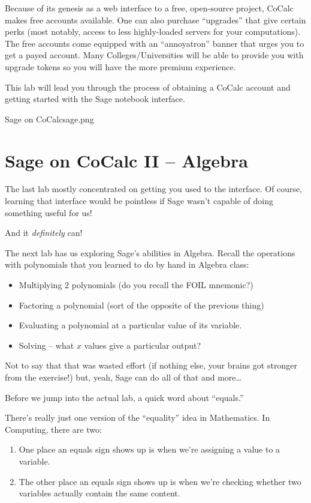Because of its genesis as a web interface to a free, open-source project, CoCalc makes free accounts available.  One can also purchase ``upgrades'' that give certain perks (most notably, access to less highly-loaded servers for your computations).  The free accounts come equipped with an ``annoyatron'' banner that urges you to get a payed account.  Many Colleges/Universities will be able to provide you with upgrade tokens so you will have the more premium experience.


This lab will lead you through the process of obtaining a CoCalc account and getting started with the Sage notebook interface.

\clearpage
\begin{worksheet}{7}{Sage on CoCalc}{sage.png}

\end{worksheet}
\clearpage

\section{Sage on CoCalc II -- Algebra}

The last lab mostly concentrated on getting you used to the interface. Of course, learning that interface would be pointless if Sage wasn't capable of doing something useful for us!

And it {\em definitely} can!

The next lab has us exploring Sage's abilities in Algebra.  Recall the operations with polynomials that you learned to do by hand in Algebra class:

\begin{itemize}
	\item Multiplying 2 polynomials (do you recall the FOIL mnemonic?)
	\item Factoring a polynomial (sort of the opposite of the previous thing)
	\item Evaluating a polynomial at a particular value of its variable.
	\item Solving -- what $x$ values give a particular output?
\end{itemize}

Not to say that that was wasted effort (if nothing else, your brains got stronger from the exercise!)
but, yeah, Sage can do all of that and more\dots

Before we jump into the actual lab, a quick word about ``equals.''

There's really just one version of the ``equality'' idea in Mathematics.  In Computing, there are two:
\begin{enumerate}
	\item One place an equals sign shows up is when we're assigning a value to a variable.
	\item The other place an equals sign shows up is when we're checking whether two variables actually contain the same content.
\end{enumerate}

